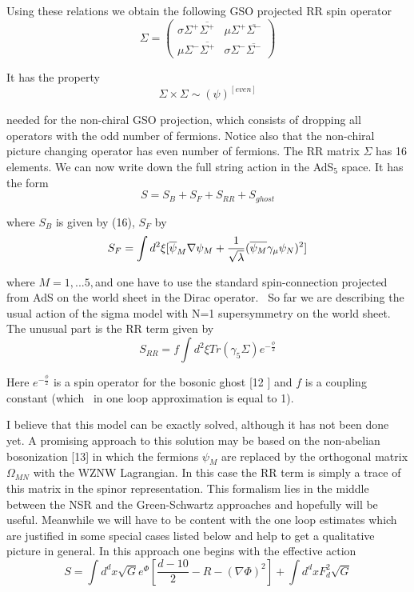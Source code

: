 \documentclass[a4paper,12pt]{article}
\begin{document}
Using these relations we obtain the following GSO projected RR spin operator 
\begin{equation}
\Sigma =( 
\begin{array}{cc}
\sigma \Sigma ^{+}\overline{\Sigma ^{+}} & \mu \Sigma ^{+}\overline{\Sigma
^{-}} \\ 
\mu \Sigma ^{-}\overline{\Sigma ^{+}} & \sigma \Sigma ^{-}\overline{\Sigma
^{-}}
\end{array}
)
\end{equation}

It has the property 
\begin{equation}
\Sigma \times \Sigma \sim \left( \psi \right) ^{[even]}
\end{equation}

needed for the non-chiral GSO projection, which consists of dropping all
operators with the odd number of fermions. Notice also that the non-chiral
picture changing operator has even number of fermions. The RR matrix $\Sigma 
$ has 16 elements. We can now write down the full string action in the AdS$%
_{5}$ space. It has the form 
\begin{equation}
S=S_{B}+S_{F}+S_{RR}+S_{ghost}
\end{equation}

where $S_{B}$ is given by (16), $S_{F}$ by 
\begin{equation}
S_{F}=\int d^{2}\xi \lbrack \overline{\psi }_{M}\nabla \psi _{M}+\frac{1}{%
\sqrt{\lambda }}(\overline{\psi _{M}}\gamma _{\mu }\psi _{N})^{2}]
\end{equation}

where $M=1,...5,$and one have to use the standard spin-connection projected
from AdS on the world sheet in the Dirac operator. \ So far we are
describing the usual action of the sigma model with N=1 supersymmetry on the
world sheet. The unusual part is the RR term given by 
\begin{equation}
S_{RR}=f\int d^{2}\xi Tr(\gamma _{5}\Sigma )e^{-\frac{\phi }{2}}
\end{equation}

Here $e^{-\frac{\phi }{2}}$ is a spin operator for the bosonic ghost [12 ]
and $f$ is a coupling constant (which \ in one loop approximation is equal
to 1).

I believe that this model can be exactly solved, although it has not been
done yet. A promising approach to this solution may be based on the
non-abelian bosonization [13] in which the fermions $\psi _{M}$ are replaced
by the orthogonal matrix $\Omega _{MN}$ with the WZNW Lagrangian. In this
case the RR term is simply a trace of this matrix in the spinor
representation. This formalism lies in the middle between the NSR and the
Green-Schwartz approaches and hopefully will be useful. Meanwhile we will
have to be content with the one loop estimates which are justified in some
special cases listed below and help to get a qualitative picture in general.
In this approach one begins with the effective action 
\begin{equation}
S=\int d^{d}x\sqrt{G}e^{\Phi }\left[ \frac{d-10}{2}-R-\left( \nabla \Phi
\right) ^{2}\right] +\int d^{d}xF_{d}^{2}\sqrt{G}
\end{equation}
\end{document}
